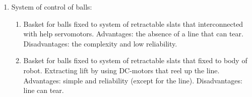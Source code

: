 \begin{enumerate}
\begin{enumerate}
\begin{enumerate}
\begin{enumerate}
	    \end{enumerate}
	    
	    \item System of control of balls:
	    \begin{enumerate}
	      \item Basket for balls fixed to system of retractable slats that interconnected  with help servomotors. Advantages: the absence of a line that can tear. Disadvantages: the complexity and low reliability.	
	      
	      \item Basket for balls fixed to system of retractable slats that fixed to body of robot. Extracting lift by using DC-motors that reel up the line. Advantages: simple and reliability (except for the line). Disadvantages: line can tear.
	      

\end{enumerate}
\end{enumerate}
\end{enumerate}
\end{enumerate}
